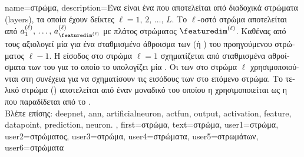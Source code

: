 {name={\foreignlanguage{greek}{στρώμα}},
	description={\foreignlanguage{greek}{Ένα}  
		\foreignlanguage{greek}{είναι ένα}  \foreignlanguage{greek}{που αποτελείται από διαδοχικά
		στρώματα} (layers), \foreignlanguage{greek}{τα οποία έχουν δείκτες $\ell=1,\,2,\,\ldots,\,L$. Το $\ell$-οστό 
		στρώμα αποτελείται από}  $a^{(\ell)}_{1},\,\ldots,\,a^{(\ell)}_{\featuredim^{(\ell)}}$ 
		\foreignlanguage{greek}{με πλάτος στρώματος $\featuredim^{(\ell)}$. Καθένας από τους}  
		\foreignlanguage{greek}{αξιολογεί μία}  \foreignlanguage{greek}{για ένα σταθμισμένο άθροισμα των} 
		 \foreignlanguage{greek}{(ή} ) \foreignlanguage{greek}{του προηγούμενου 
		στρώματος $\ell-1$. Η εί\-σοδος στο στρώμα $\ell=1$ σχηματίζεται από σταθμισμένα αθροίσματα των}  
		 \foreignlanguage{greek}{του}  \foreignlanguage{greek}{για το 
		οποίο το}  \foreignlanguage{greek}{υπολογίζει μία} . 
		\foreignlanguage{greek}{Οι}  \foreignlanguage{greek}{των}  \foreignlanguage{greek}{στο 
		στρώμα $\ell$ χρησιμοποιούνται στη συνέχεια για να σχηματίσουν τις εισόδους των}  \foreignlanguage{greek}{στο 
		επόμενο στρώμα. Το τελικό στρώμα} () \foreignlanguage{greek}{αποτελείται από έναν μοναδικό} 
		 \foreignlanguage{greek}{του οποίου η}  \foreignlanguage{greek}{χρησιμοποιείται ως 
		η}  \foreignlanguage{greek}{που παραδίδεται από το} . 
		\\
		\foreignlanguage{greek}{Βλέπε επίσης:} \gls{deepnet}, \gls{ann}, \gls{artificialneuron}, \gls{actfun}, \gls{output}, \gls{activation}, 
		\gls{feature}, \gls{datapoint}, \gls{prediction}, \gls{neuron}. }, 
	first={\foreignlanguage{greek}{στρώμα}},
	text={\foreignlanguage{greek}{στρώμα}},
	user1={\foreignlanguage{greek}{στρώμα}}, %
	user2={\foreignlanguage{greek}{στρώματος}}, %
	user3={\foreignlanguage{greek}{στρώμα}}, %
	user4={\foreignlanguage{greek}{στρώματα}}, %
	user5={\foreignlanguage{greek}{στρωμάτων}}, %
	user6={\foreignlanguage{greek}{στρώματα}} %
}


